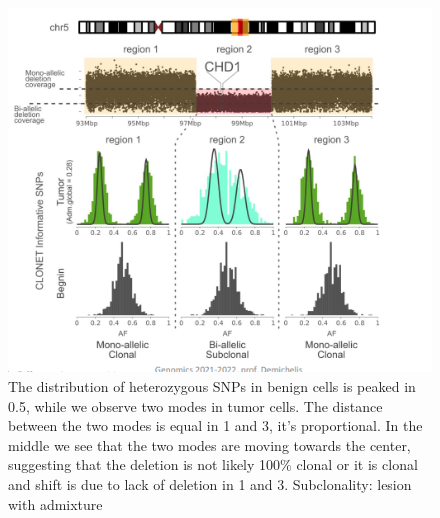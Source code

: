 \begin{figure}
	\centering
	\includegraphics[width=0.7\linewidth]{PR_2741.png}
	\caption{ The distribution of heterozygous SNPs in benign cells is peaked in 0.5, while we observe two modes in tumor cells. The distance between the two modes is equal in 1 and 3, it’s proportional. In the middle we see that the two modes are moving towards the center, suggesting that the deletion is not likely 100\% clonal or it is clonal and shift is due to lack of deletion in 1 and 3. Subclonality: lesion with admixture}
	\label{fig:adm}
	\end{figure}

























